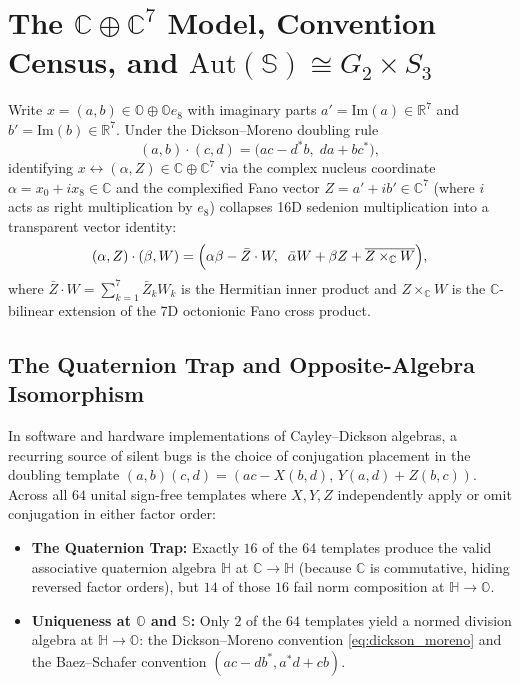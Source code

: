 \documentclass[journal,twoside]{IEEEtran}
\theoremstyle{definition}
\theoremstyle{remark}
\newcommand{\R}{\mathbb{R}}
\newcommand{\C}{\mathbb{C}}
\newcommand{\Ha}{\mathbb{H}}
\newcommand{\Oc}{\mathbb{O}}
\newcommand{\Se}{\mathbb{S}}
\newcommand{\ImPart}{\mathrm{Im}}
\newcommand{\Aut}{\mathrm{Aut}}
\begin{document}
\section{The $\C \oplus \C^7$ Model, Convention Census, and $\Aut(\Se) \cong G_2 \times S_3$}
\label{sec:automorphisms}
Write $x = (a, b) \in \Oc \oplus \Oc e_8$ with imaginary parts $a' = \ImPart(a) \in \R^7$ and $b' = \ImPart(b) \in \R^7$. Under the Dickson--Moreno doubling rule
\begin{equation}
    (a, b)\cdot (c, d) = \bigl(ac - d^* b,\; da + b c^*\bigr),
    \label{eq:dickson_moreno}
\end{equation}
identifying $x \leftrightarrow (\alpha, Z) \in \C \oplus \C^7$ via the complex nucleus coordinate $\alpha = x_0 + i x_8 \in \C$ and the complexified Fano vector $Z = a' + i b' \in \C^7$ (where $i$ acts as right multiplication by $e_8$) collapses 16D sedenion multiplication into a transparent vector identity:
\begin{equation}
    (\alpha, Z)\cdot(\beta, W) = \Bigl(\alpha\beta - \bar{Z}\cdot W,\;\; \bar{\alpha} W + \beta Z + \overline{Z \times_{\C} W}\Bigr),
    \label{eq:c_c7_model}
\end{equation}
where $\bar{Z}\cdot W = \sum_{k=1}^7 \bar{Z}_k W_k$ is the Hermitian inner product and $Z \times_{\C} W$ is the $\C$-bilinear extension of the 7D octonionic Fano cross product.

\subsection{The Quaternion Trap and Opposite-Algebra Isomorphism}
In software and hardware implementations of Cayley--Dickson algebras, a recurring source of silent bugs is the choice of conjugation placement in the doubling template $(a,b)(c,d) = (ac - X(b,d),\, Y(a,d) + Z(b,c))$. Across all $64$ unital sign-free templates where $X, Y, Z$ independently apply or omit conjugation in either factor order:
\begin{itemize}
    \item \textbf{The Quaternion Trap:} Exactly $16$ of the $64$ templates produce the valid associative quaternion algebra $\Ha$ at $\C \to \Ha$ (because $\C$ is commutative, hiding reversed factor orders), but $14$ of those $16$ fail norm composition at $\Ha \to \Oc$.
    \item \textbf{Uniqueness at $\Oc$ and $\Se$:} Only $2$ of the $64$ templates yield a normed division algebra at $\Ha \to \Oc$: the Dickson--Moreno convention \eqref{eq:dickson_moreno} and the Baez--Schafer convention $(ac - d b^*, a^* d + c b)$.
\end{itemize}
\end{document}
